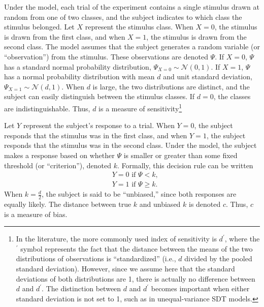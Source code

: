 \documentclass[man]{apa6}
\begin{document}
Under the model, each trial of the experiment contains a single stimulus drawn at random from one of two classes, and the subject indicates to which class the stimulus belonged. Let $X$ represent the stimulus class. When $X=0$, the stimulus is drawn from the first class, and when $X=1$, the stimulus is drawn from the second class. The model assumes that the subject generates a random variable (or ``observation'') from the stimulus. These observations are denoted $\Psi$. If $X=0$, $\Psi$ has a standard normal probability distribution, $\Psi_{X=0}\sim{}\mathcal{N}\left(0,1\right)$. If $X=1$, $\Psi$ has a normal probability distribution with mean $d$ and unit standard deviation,
$\Psi_{X=1}\sim{}\mathcal{N}\left(d,1\right)$. When $d$ is large, the two distributions are distinct, and the subject can easily distinguish between the stimulus classes. If $d=0$, the classes are indistinguishable. Thus, $d$ is a measure of sensitivity\footnote{In the literature, the more commonly used index of sensitivity is $d^\prime$, where the $^\prime$ symbol represents the fact that the distance between the means of the two distributions of observations is ``standardized''  (i.e., $d$ divided by the pooled standard deviation). However, since we assume here that the standard deviations of both distributions are 1, there is actually no difference between $d$ and $d^\prime$. The distinction between $d$ and $d^\prime$ becomes important when either standard deviation is not set to 1, such as in unequal-variance SDT models.}

Let $Y$ represent the subject's response to a trial. When $Y=0$, the subject responds that the stimulus was in the first class, and when $Y=1$, the subject responds that the stimulus was in the second class. Under the model, the subject makes a response based on whether $\Psi$ is smaller or greater than some fixed threshold (or ``criterion''), denoted $k$. Formally, this decision rule can be written
\begin{eqnarray*}
&Y=0\textrm{ if }\Psi<k\textrm{,}\\
&Y=1\textrm{ if }\Psi\ge{}k\textrm{.}
\end{eqnarray*}When $k=\frac{d}{2}$, the subject is said to be ``unbiased,'' since both responses are equally likely. The distance between true $k$ and unbiased $k$ is denoted $c$. Thus, $c$ is a measure of bias.
\end{document}
